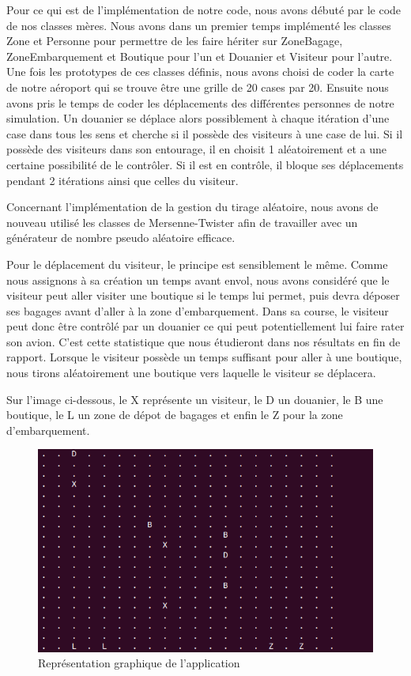 \documentclass[12pt,french]{article} %
\begin{document}
Pour ce qui est de l'implémentation de notre code, nous avons débuté par le code de nos classes mères. Nous avons dans un premier temps implémenté les classes Zone et Personne pour permettre de les faire hériter sur ZoneBagage, ZoneEmbarquement et Boutique pour l'un et Douanier et Visiteur pour l'autre. Une fois les prototypes de ces classes définis, nous avons choisi de coder la carte de notre aéroport qui se trouve être une grille de 20 cases par 20. Ensuite nous avons pris le temps de coder les déplacements des différentes personnes de notre simulation. Un douanier se déplace alors possiblement à chaque itération d'une case dans tous les sens et cherche si il possède des visiteurs à une case de lui. Si il possède des visiteurs dans son entourage, il en choisit 1 aléatoirement et a une certaine possibilité de le contrôler. Si il est en contrôle, il bloque ses déplacements pendant 2 itérations ainsi que celles du visiteur.
\newline

Concernant l'implémentation de la gestion du tirage aléatoire, nous avons de nouveau utilisé les classes de Mersenne-Twister afin de travailler avec un générateur de nombre pseudo aléatoire efficace.
\newline


Pour le déplacement du visiteur, le principe est sensiblement le même. Comme nous assignons à sa création un temps avant envol, nous avons considéré que le visiteur peut aller visiter une boutique si le temps lui permet, puis devra déposer ses bagages avant d'aller à la zone d'embarquement. Dans sa course, le visiteur peut donc être contrôlé par un douanier ce qui peut potentiellement lui faire rater son avion. C'est cette statistique que nous étudieront dans nos résultats en fin de rapport. Lorsque le visiteur possède un temps suffisant pour aller à une boutique, nous tirons aléatoirement une boutique vers laquelle le visiteur se déplacera.
\newline



Sur l'image ci-dessous, le X représente un visiteur, le D un douanier, le B une boutique, le L un zone de dépot de bagages et enfin le Z pour la zone d'embarquement.


\begin{figure}[H]
	\centering
	\includegraphics[scale=0.5]{mp.png}
	\caption{Représentation graphique de l'application}    
\end{figure}
\end{document}
